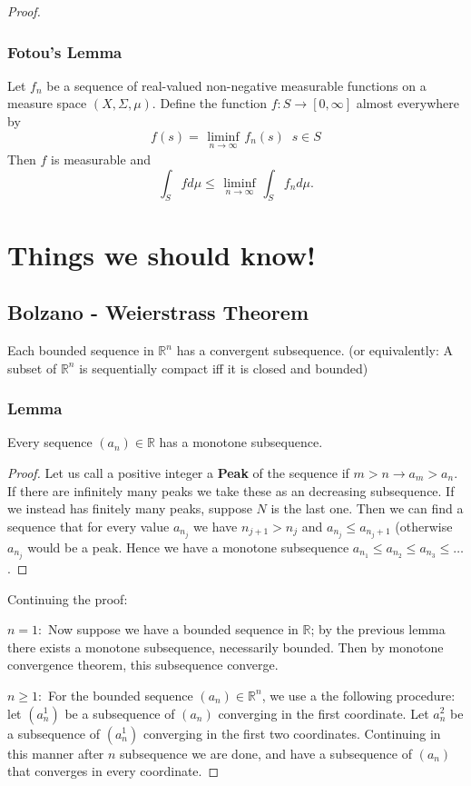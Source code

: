 \documentclass[titlepage]{article}
\begin{document}
\begin{proof}
 \subsubsection{Fotou's Lemma}
  Let $f_n$ be a sequence of real-valued non-negative measurable functions on a measure space $(X,\Sigma, \mu)$. Define the function $f: S \rightarrow [0,\infty]$ almost everywhere by
  \begin{equation}
  f(s) = \liminf \limits_{\substack{n\rightarrow \infty}} f_n(s)\;\; s\in S
  \end{equation}
Then $f$ is measurable and 
\begin{equation}
\int_S fd\mu \leq \liminf \limits_{\substack{n\rightarrow \infty}}
\int_S f_n d\mu.
\end{equation}  
  
\section{Things we should know!}
\subsection{Bolzano - Weierstrass Theorem}
Each bounded sequence in $\mathbb{R}^n$ has a convergent subsequence. 
(or equivalently: A subset of $\mathbb{R}^n$ is sequentially compact iff it is closed and bounded)

\subsubsection{Lemma}
Every sequence $(a_n) \in \mathbb{R}$ has a monotone subsequence.
\begin{proof}

Let us call a positive integer a \textbf{Peak} of the sequence if $m>n \rightarrow a_m>a_n$. If there are infinitely many peaks we take these as an decreasing subsequence.
If we instead has finitely many peaks, suppose $N$ is the last one. Then we can find a sequence that for every value $a_{n_j}$ we have 
$n_{j+1} > n_j$ and $a_{n_j} \leq a_{n_j+1}$ (otherwise $a_{n_j}$ would be a peak. Hence we have a monotone subsequence $a_{n_1} \leq a_{n_2} \leq a_{n_3} \leq \ldots $.
\end{proof}
Continuing the proof:

$n= 1:$ Now suppose we have a bounded sequence in $\mathbb{R}$; by the previous lemma there exists a monotone subsequence, necessarily bounded. Then by monotone convergence theorem, this subsequence converge.

$n \geq 1: $ For the bounded sequence $(a_n) \in \mathbb{R}^n$, we use a the following procedure:
let $(a_n^1)$ be a subsequence of $(a_n)$  converging in the first coordinate. Let $a_n^2$ be a subsequence of  $(a_n^1)$ converging in the first two coordinates. Continuing in this manner after $n$ subsequence we are done, and have a subsequence of $(a_n)$ that converges in every coordinate.
\end{proof}
\end{document}
